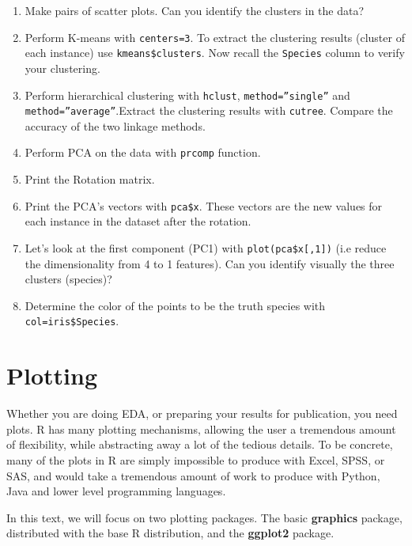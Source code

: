 \documentclass[]{book}
\providecommand{\tightlist}{%
  \setlength{\itemsep}{0pt}\setlength{\parskip}{0pt}}
\theoremstyle{definition}
\theoremstyle{definition}
\theoremstyle{definition}
\theoremstyle{remark}
\begin{document}
\begin{enumerate}
  \begin{enumerate}
  \def\labelenumii{\arabic{enumii}.}
  \tightlist
  \item
    Make pairs of scatter plots. Can you identify the clusters in the
    data?
  \item
    Perform K-means with \texttt{centers=3}. To extract the clustering
    results (cluster of each instance) use \texttt{kmeans\$clusters}.
    Now recall the \texttt{Species} column to verify your clustering.
  \item
    Perform hierarchical clustering with \texttt{hclust},
    \texttt{method=”single”} and \texttt{method=”average”}.Extract the
    clustering results with \texttt{cutree}. Compare the accuracy of the
    two linkage methods.
  \item
    Perform PCA on the data with \texttt{prcomp} function.
  \item
    Print the Rotation matrix.
  \item
    Print the PCA's vectors with \texttt{pca\$x}. These vectors are the
    new values for each instance in the dataset after the rotation.
  \item
    Let's look at the first component (PC1) with
    \texttt{plot(pca\$x{[},1{]})} (i.e reduce the dimensionality from 4
    to 1 features). Can you identify visually the three clusters
    (species)?\\
  \item
    Determine the color of the points to be the truth species with
    \texttt{col=iris\$Species}.
  \end{enumerate}
\end{enumerate}

\chapter{Plotting}\label{plotting}

Whether you are doing EDA, or preparing your results for publication,
you need plots. R has many plotting mechanisms, allowing the user a
tremendous amount of flexibility, while abstracting away a lot of the
tedious details. To be concrete, many of the plots in R are simply
impossible to produce with Excel, SPSS, or SAS, and would take a
tremendous amount of work to produce with Python, Java and lower level
programming languages.

In this text, we will focus on two plotting packages. The basic
\textbf{graphics} package, distributed with the base R distribution, and
the \textbf{ggplot2} package.
\end{document}
